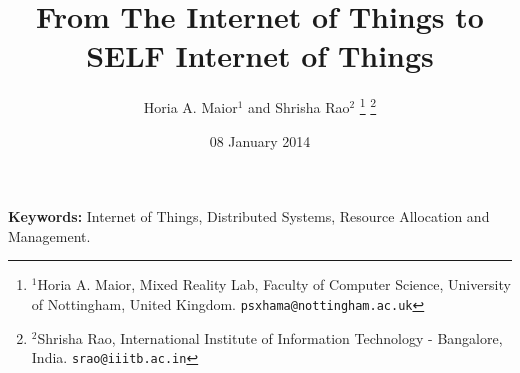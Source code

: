 \documentclass[letterpaper, 10 pt, conference]{ieeeconf}
\title{From The Internet of Things to SELF Internet of Things}
\author{Horia A. Maior$^{1}$ and Shrisha Rao$^{2}$%
\thanks{$^{1}$Horia A. Maior, Mixed Reality Lab, Faculty of Computer Science, University of Nottingham, United Kingdom.
        {\tt\small psxhama@nottingham.ac.uk}}%
\thanks{$^{2}$Shrisha Rao, International Institute of Information Technology - Bangalore, India.
        {\tt\small srao@iiitb.ac.in}}%
}
\begin{document}
\maketitle
\thispagestyle{empty}
\pagestyle{empty}




\date{08 January 2014}




{\bf Keywords:} Internet of Things, Distributed Systems, Resource Allocation and Management.






%



\end{document}
